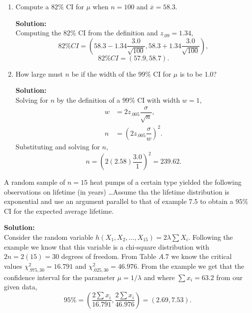 \documentclass[12pt]{article}
\makeatletter
\theoremstyle{homework}
\newenvironment{exercise}[1]
{\def\@currentlabel{#1}\exercisecore}
{\endexercisecore}
\newcommand{\localhead}[1]{\par\smallskip\noindent\textbf{#1}\nobreak\\}%
\newcommand\solution{\localhead{Solution:}}
\makeatother
\begin{document}
\begin{exercise}{7.4}
\begin{enumerate}
      \item Compute a $82\%$ CI for $\mu$ when $n = 100$ and $\overline{x} = 58.3$.\\
      \solution Computing the $82\%$ CI from the definition and $z_{.09} = 1.34$,
      \begin{equation*}
        82\% CI = (58.3 - 1.34\dfrac{3.0}{\sqrt{100}}, 58.3 + 1.34\dfrac{3.0}{\sqrt{100}}),
      \end{equation*}
      \begin{equation*}
        82\% CI = (57.9, 58.7).
      \end{equation*}
      \vspace{.25in}

      \item How large must $n$ be if the width of the $99\%$ CI for $\mu$ is to be 1.0?
      \solution Solving for $n$ by the definition of a $99\%$ CI with width $w = 1$,
      \begin{align*}
        w &= 2z_{.005}\dfrac{\sigma}{\sqrt{n}},\\
        n &= (2z_{.005}\dfrac{\sigma}{w})^2.
      \end{align*}
      Substituting and solving for $n$,
      \begin{equation*}
        n = (2(2.58)\dfrac{3.0}{1})^2 = 239.62.
      \end{equation*}

    \end{enumerate}
\end{exercise}
\vspace{.5in}













\begin{exercise}{7.10} A random sample of $n = 15$ heat pumps of a certain type yielded the
following observations on lifetime (in years) \dots Assume tha the lifetime distribution is exponential
and use an argument parallel to that of example 7.5 to obtain a $95\%$ CI for the expected average lifetime.\\

\solution Consider the random variable $h(X_1,X_2,\dots,X_{15}) = 2\lambda\sum X_i$. Following the 
example we know that this variable is a chi-square distribution with $2n = 2(15) = 30$ degrees of freedom. From 
Table $A.7$ we know the critical values $\chi^2_{.975,30} = 16.791$ and $\chi^2_{.025,30} = 46.976$. From the example we get 
that the confidence interval for the parameter $\mu = 1/\lambda$ and where $\sum x_i = 63.2$ from our given data,
\begin{equation*}
  95\% = (\dfrac{2\sum x_i}{16.791}, \dfrac{2\sum x_i}{46.976}) = (2.69, 7.53).
\end{equation*}
\end{exercise}
\vspace{.5in}
\end{document}
